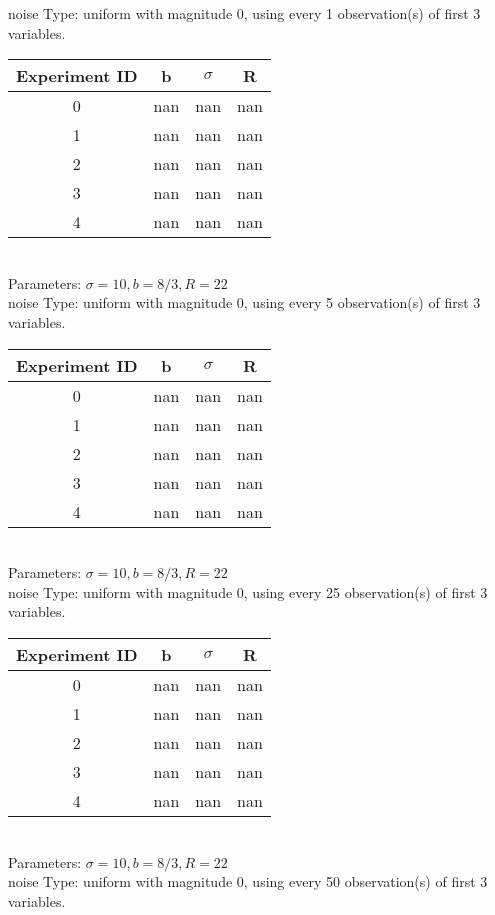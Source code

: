 \begin{multicols}{3}
noise Type: uniform with magnitude 0, using every 1 observation(s) of first 3 variables.\\
\begin{tabular}{cccc}
\hline Experiment ID & b & $\sigma$ & R \\ \hline 
0 & nan & nan & nan\\ \hline 
 1 & nan & nan & nan\\ \hline 
 2 & nan & nan & nan\\ \hline 
 3 & nan & nan & nan\\ \hline 
 4 & nan & nan & nan\\ \hline 
 \end{tabular}\\
Parameters: $\sigma=10, b=8/3, R=22$\\
noise Type: uniform with magnitude 0, using every 5 observation(s) of first 3 variables.\\
\begin{tabular}{cccc}
\hline Experiment ID & b & $\sigma$ & R \\ \hline 
0 & nan & nan & nan\\ \hline 
 1 & nan & nan & nan\\ \hline 
 2 & nan & nan & nan\\ \hline 
 3 & nan & nan & nan\\ \hline 
 4 & nan & nan & nan\\ \hline 
 \end{tabular}\\
Parameters: $\sigma=10, b=8/3, R=22$\\
noise Type: uniform with magnitude 0, using every 25 observation(s) of first 3 variables.\\
\begin{tabular}{cccc}
\hline Experiment ID & b & $\sigma$ & R \\ \hline 
0 & nan & nan & nan\\ \hline 
 1 & nan & nan & nan\\ \hline 
 2 & nan & nan & nan\\ \hline 
 3 & nan & nan & nan\\ \hline 
 4 & nan & nan & nan\\ \hline 
 \end{tabular}\\
Parameters: $\sigma=10, b=8/3, R=22$\\
noise Type: uniform with magnitude 0, using every 50 observation(s) of first 3 variables.\\
\begin{tabular}{cccc}

\end{tabular}
\end{multicols}
